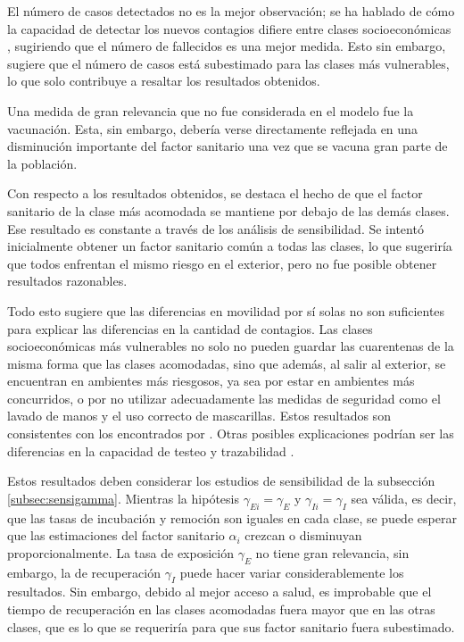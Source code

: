 El número de casos detectados no es la mejor observación; se ha hablado de cómo la capacidad de detectar los nuevos contagios difiere entre clases socioeconómicas \cite{Mena2021}, sugiriendo que el número de fallecidos es una mejor medida. Esto sin embargo, sugiere que el número de casos está subestimado para las clases más vulnerables, lo que solo contribuye a resaltar los resultados obtenidos.

Una medida de gran relevancia que no fue considerada en el modelo fue la vacunación. Esta, sin embargo, debería verse directamente reflejada en una disminución importante del factor sanitario una vez que se vacuna gran parte de la población.

Con respecto a los resultados obtenidos, se destaca el hecho de que el factor sanitario de la clase más acomodada se mantiene por debajo de las demás clases. Ese resultado es constante a través de los análisis de sensibilidad. Se intentó inicialmente obtener un factor sanitario común a todas las clases, lo que sugeriría que todos enfrentan el mismo riesgo en el exterior, pero no fue posible obtener resultados razonables.

Todo esto sugiere que las diferencias en movilidad por sí solas no son suficientes para explicar las diferencias en la cantidad de contagios. Las clases socioeconómicas más vulnerables no solo no pueden guardar las cuarentenas de la misma forma que las clases acomodadas, sino que además, al salir al exterior, se encuentran en ambientes más riesgosos, ya sea por estar en ambientes más concurridos, o por no utilizar adecuadamente las medidas de seguridad como el lavado de manos y el uso correcto de mascarillas. Estos resultados son consistentes con los encontrados por \cite{Chang2021}. Otras posibles explicaciones podrían ser las diferencias en la capacidad de testeo y trazabilidad \cite{Bennett2021}\cite{Mena2021}.

Estos resultados deben considerar los estudios de sensibilidad de la subsección \ref{subsec:sensigamma}. Mientras la hipótesis \(\gamma_{Ei} = \gamma_E\) y \(\gamma_{Ii} = \gamma_I\) sea válida, es decir, que las tasas de incubación y remoción son iguales en cada clase, se puede esperar que las estimaciones del factor sanitario \(\alpha_i\) crezcan o disminuyan proporcionalmente. La tasa de exposición \(\gamma_E\) no tiene gran relevancia, sin embargo, la de recuperación \(\gamma_I\) puede hacer variar considerablemente los resultados. Sin embargo, debido al mejor acceso a salud, es improbable que el tiempo de recuperación en las clases acomodadas fuera mayor que en las otras clases, que es lo que se requeriría para que sus factor sanitario fuera subestimado.

